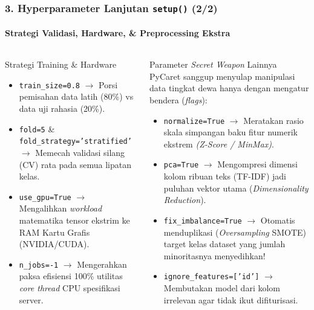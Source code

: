 \documentclass[t,aspectratio=169,xcolor=dvipsnames]{beamer}
\begin{document}
\begin{frame}
    \frametitle{3. Hyperparameter Lanjutan \texttt{setup()} (2/2)}
    \framesubtitle{Strategi Validasi, Hardware, \& Preprocessing Ekstra}
    \scriptsize
    \begin{columns}[T]
        \begin{block}{Strategi Training \& Hardware}
            \begin{itemize}
                \item \texttt{train\_size=0.8} $\rightarrow$ Porsi pemisahan data latih (80\%) vs data uji rahasia (20\%).
                \item \texttt{fold=5} \& \texttt{fold\_strategy='stratified'} $\rightarrow$ Memecah validasi silang (CV) rata pada semua lipatan kelas.
                \item \texttt{use\_gpu=True} $\rightarrow$ Mengalihkan \textit{workload} matematika tensor ekstrim ke RAM Kartu Grafis (NVIDIA/CUDA).
                \item \texttt{n\_jobs=-1} $\rightarrow$ Mengerahkan paksa efisiensi 100\% utilitas \textit{core thread} CPU spesifikasi server.
            \end{itemize}
        \end{block}

        \begin{alertblock}{Parameter \textit{Secret Weapon} Lainnya}
            PyCaret sanggup menyulap manipulasi data tingkat dewa hanya dengan mengatur bendera (\textit{flags}):
            \begin{itemize}
                \item \texttt{normalize=True} $\rightarrow$ Meratakan rasio skala simpangan baku fitur numerik ekstrem \textit{(Z-Score / MinMax)}.
                \item \texttt{pca=True} $\rightarrow$ Mengompresi dimensi kolom ribuan teks (TF-IDF) jadi puluhan vektor utama (\textit{Dimensionality Reduction}).
                \item \texttt{fix\_imbalance=True} $\rightarrow$ Otomatis menduplikasi (\textit{Oversampling} SMOTE) target kelas dataset yang jumlah minoritasnya menyedihkan!
                \item \texttt{ignore\_features=['id']} $\rightarrow$ Membutakan model dari kolom irrelevan agar tidak ikut difiturisasi.
            \end{itemize}
        \end{alertblock}
    \end{columns}
\end{frame}
\end{document}
